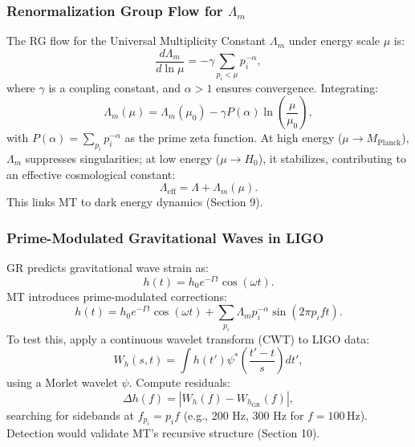 \documentclass[12]{amsart}
\theoremstyle{plain}
\begin{document}
\subsubsection{Renormalization Group Flow for \(\Lambda_m\)}
The RG flow for the Universal Multiplicity Constant \(\Lambda_m\) under energy scale \(\mu\) is:
\begin{equation}
\frac{d \Lambda_m}{d \ln \mu} = -\gamma \sum_{p_i < \mu} p_i^{-\alpha},
\end{equation}
where \( \gamma \) is a coupling constant, and \( \alpha > 1 \) ensures convergence. Integrating:
\begin{equation}
\Lambda_m(\mu) = \Lambda_m(\mu_0) - \gamma P(\alpha) \ln \left( \frac{\mu}{\mu_0} \right),
\end{equation}
with \( P(\alpha) = \sum_{p_i} p_i^{-\alpha} \) as the prime zeta function. At high energy (\(\mu \to M_{\text{Planck}}\)), \(\Lambda_m\) suppresses singularities; at low energy (\(\mu \to H_0\)), it stabilizes, contributing to an effective cosmological constant:
\begin{equation}
\Lambda_{\text{eff}} = \Lambda + \Lambda_m(\mu).
\end{equation}
This links MT to dark energy dynamics (Section 9).

\subsubsection{Prime-Modulated Gravitational Waves in LIGO}
GR predicts gravitational wave strain as:
\begin{equation}
h(t) = h_0 e^{-\Gamma t} \cos(\omega t).
\end{equation}
MT introduces prime-modulated corrections:
\begin{equation}
h(t) = h_0 e^{-\Gamma t} \cos(\omega t) + \sum_{p_i} \Lambda_m p_i^{-\alpha} \sin(2 \pi p_i f t).
\end{equation}
To test this, apply a continuous wavelet transform (CWT) to LIGO data:
\begin{equation}
W_h(s, t) = \int h(t') \psi^*\left( \frac{t' - t}{s} \right) dt',
\end{equation}
using a Morlet wavelet \(\psi\). Compute residuals:
\begin{equation}
\Delta h(f) = |W_h(f) - W_{h_{\text{GR}}}(f)|,
\end{equation}
searching for sidebands at \( f_{p_i} = p_i f \) (e.g., 200 Hz, 300 Hz for \( f = 100 \, \text{Hz} \)). Detection would validate MT’s recursive structure (Section 10).
\end{document}
